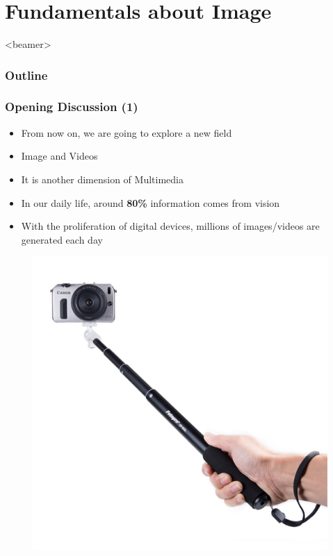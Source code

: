 \section{Fundamentals about Image}
\begin{frame}<beamer>
    \frametitle{Outline}
    \tableofcontents[currentsection]
\end{frame}

\begin{frame}
 \frametitle{Opening Discussion (1)}
 \begin{itemize}
 	\item {From now on, we are going to explore a new field}
 	\item {Image and Videos}
 	\item {It is another dimension of Multimedia}
 	\item {In our daily life, around \textbf{80\%} information comes from vision}
 	\item {With the proliferation of digital devices, millions of images/videos are generated each day}
 \end{itemize}
 \begin{figure}
 \begin{center}
	\includegraphics[width=0.350\linewidth]{./figs/support.pdf}
 \end{center}
 \end{figure}
\end{frame}
 
